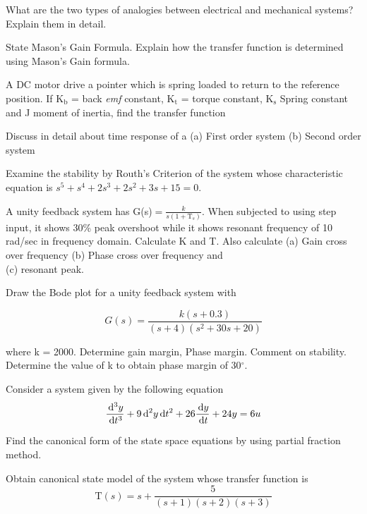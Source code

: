 \item \iitem What are the two types of analogies between electrical and mechanical systems?
  Explain them in detail.
\item State Mason's Gain Formula. Explain how the transfer function is
  determined using Mason's Gain formula.
\ene
\Or
\item A DC motor drive a pointer which is spring loaded to return to the
  reference position. If K$_\text{b}$ = back \emph{emf} constant, K$_\text{t}$ 
  = torque constant, K$_\text{s}$ Spring constant and J moment of inertia, find
  the transfer function

\item Discuss in detail about time response of a 
  (a) First order system
  (b) Second order system
\Or
\item Examine the stability by Routh's Criterion of the system whose characteristic equation is
  $s^5 + s^4 + 2s^3 + 2s^2 + 3s + 15 = 0$.

\item A unity feedback system has G(s)$ = \frac{k}{s(1 + \text{T}_s)}$. When subjected
  to using step input, it shows 30\% peak overshoot while it shows resonant frequency
  of 10 rad/sec in frequency domain. Calculate K and T. Also calculate
  (a) Gain cross over frequency 
  (b) Phase cross over frequency and\\
  (c) resonant peak.
\Or
\item Draw the Bode plot for a unity feedback system with

\[ G(s) = \dfrac{k(s + 0.3)}{(s + 4)(s^2 + 30s + 20)}\]

where k = 2000. Determine gain margin, Phase margin. Comment on stability.
Determine the value of k to obtain phase margin of 30$^\circ$.

\item Consider a system given by the following equation
\[ \dfrac{\,\mathrm{d}^3y}{\,\mathrm{d} t^3} + 9{\,\mathrm{d}^2y}{\,\mathrm{d} t^2} + 26\dfrac{\,\mathrm{d} y}{\,\mathrm{d} t} + 24y = 6u\]

Find the canonical form of the state space equations by using partial fraction method.
\Or
\item Obtain canonical state model of the system whose transfer function is
\[ \text{T}(s) = s + \dfrac{5}{(s + 1)(s + 2)(s + 3)} \]

\markC
\ene
